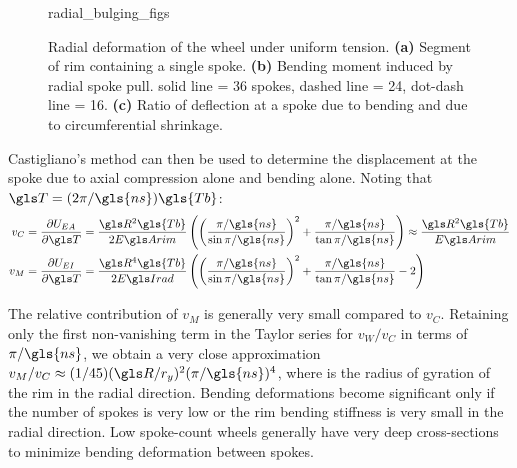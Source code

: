 \documentclass[\rootdir/thesis.tex]{subfiles}
\begin{document}
\begin{figure}
\centering
{radial_bulging_figs}
\caption{Radial deformation of the wheel under uniform tension. \textbf{(a)} Segment of rim containing a single spoke. \textbf{(b)} Bending moment induced by radial spoke pull. solid line = 36 spokes, dashed line = 24, dot-dash line = 16. \textbf{(c)} Ratio of deflection at a spoke due to bending and due to circumferential shrinkage.}
\label{fig:radial_bulging}
\end{figure}

Castigliano's method can then be used to determine the displacement at the spoke due to axial compression alone and bending alone. Noting that $\T = (2\pi/\gls{ns})\gls{Tb}$:
\begin{align}
v_C &= \frac{\partial U_{EA}}{\partial \T} = \frac{\R^2\gls{Tb}}{2\EA} \left( \left(\frac{\pi/\gls{ns}}{\sin{\pi/\gls{ns}}}\right)^2 +
    \frac{\pi/\gls{ns}}{\tan{\pi/\gls{ns}}}\right)
    \approx \frac{\R^2\gls{Tb}}{\EA}\label{eq:vC}\\
v_M &= \frac{\partial U_{EI}}{\partial \T} = \frac{\R^4\gls{Tb}}{2\EIr} \left( \left(\frac{\pi/\gls{ns}}{\sin{\pi/\gls{ns}}}\right)^2 +
    \frac{\pi/\gls{ns}}{\tan{\pi/\gls{ns}}} - 2\right)\label{eq:vM}
\end{align}

The relative contribution of $v_M$ is generally very small compared to $v_C$. Retaining only the first non-vanishing term in the Taylor series for $v_W/v_C$ in terms of $\pi/\gls{ns}$, we obtain a very close approximation $v_M/v_C\approx(1/45)(\R/\ry)^2(\pi/\gls{ns})^4$, where \ry is the radius of gyration of the rim in the radial direction. Bending deformations become significant only if the number of spokes is very low or the rim bending stiffness is very small in the radial direction. Low spoke-count wheels generally have very deep cross-sections to minimize bending deformation between spokes.
\end{document}
